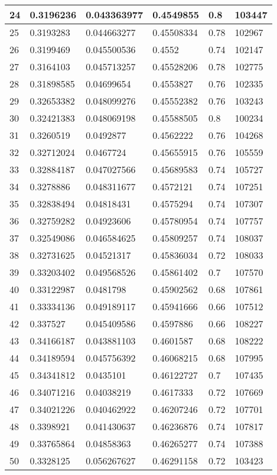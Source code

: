 \begin{longtable}{|l|l|l|l|l|l|}
24 & 0.3196236 & 0.043363977 & 0.4549855 & 0.8 & 103447 \\ \hline 
25 & 0.3193283 & 0.044663277 & 0.45508334 & 0.78 & 102967 \\ \hline 
26 & 0.3199469 & 0.045500536 & 0.4552 & 0.74 & 102147 \\ \hline 
27 & 0.3164103 & 0.045713257 & 0.45528206 & 0.78 & 102775 \\ \hline 
28 & 0.31898585 & 0.04699654 & 0.4553827 & 0.76 & 102335 \\ \hline 
29 & 0.32653382 & 0.048099276 & 0.45552382 & 0.76 & 103243 \\ \hline 
30 & 0.32421383 & 0.048069198 & 0.45588505 & 0.8 & 100234 \\ \hline 
31 & 0.3260519 & 0.0492877 & 0.4562222 & 0.76 & 104268 \\ \hline 
32 & 0.32712024 & 0.0467724 & 0.45655915 & 0.76 & 105559 \\ \hline 
33 & 0.32884187 & 0.047027566 & 0.45689583 & 0.74 & 105727 \\ \hline 
34 & 0.3278886 & 0.048311677 & 0.4572121 & 0.74 & 107251 \\ \hline 
35 & 0.32838494 & 0.04818431 & 0.4575294 & 0.74 & 107307 \\ \hline 
36 & 0.32759282 & 0.04923606 & 0.45780954 & 0.74 & 107757 \\ \hline 
37 & 0.32549086 & 0.046584625 & 0.45809257 & 0.74 & 108037 \\ \hline 
38 & 0.32731625 & 0.04521317 & 0.45836034 & 0.72 & 108033 \\ \hline 
39 & 0.33203402 & 0.049568526 & 0.45861402 & 0.7 & 107570 \\ \hline 
40 & 0.33122987 & 0.0481798 & 0.45902562 & 0.68 & 107861 \\ \hline 
41 & 0.33334136 & 0.049189117 & 0.45941666 & 0.66 & 107512 \\ \hline 
42 & 0.337527 & 0.045409586 & 0.4597886 & 0.66 & 108227 \\ \hline 
43 & 0.34166187 & 0.043881103 & 0.4601587 & 0.68 & 108222 \\ \hline 
44 & 0.34189594 & 0.045756392 & 0.46068215 & 0.68 & 107995 \\ \hline 
45 & 0.34341812 & 0.0435101 & 0.46122727 & 0.7 & 107435 \\ \hline 
46 & 0.34071216 & 0.04038219 & 0.4617333 & 0.72 & 107669 \\ \hline 
47 & 0.34021226 & 0.040462922 & 0.46207246 & 0.72 & 107701 \\ \hline 
48 & 0.3398921 & 0.041430637 & 0.46236876 & 0.74 & 107817 \\ \hline 
49 & 0.33765864 & 0.04858363 & 0.46265277 & 0.74 & 107388 \\ \hline 
50 & 0.3328125 & 0.056267627 & 0.46291158 & 0.72 & 103423 \\ \hline 
\end{longtable}